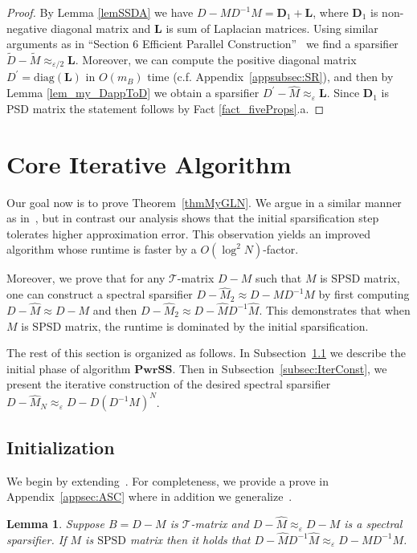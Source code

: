\documentclass[11pt]{article}
\newcommand{\SPSD}{\mathrm{SPSD}}
\newcommand{\GL}{\mathcal{T}}
\newcommand{\PwrSS}{\mathrm{\mathbf{PwrSS}}}
\newcommand{\wD}{\widetilde{D}}
\newcommand{\wM}{\widetilde{M}}
\newcommand{\hM}{\widehat{M}}
\newcommand{\Di}{D^{-1}}
\newcommand{\mD}{\mathbf{D}}
\newcommand{\mL}{\mathbf{L}}
\newcommand{\diag}{\mathrm{diag}}
\newcommand{\prm}{\prime}
\newcommand{\eps}{\epsilon}
\renewcommand{\eps}{\varepsilon}
\newcommand{\mylemma}[2]{\begin{lem}\label{lem:#1}#2\end{lem}}
\newtheorem{lem}[thm]{Lemma}
\numberwithin{thm}{section}
\begin{document}
\begin{proof}
By Lemma \ref{lemSSDA} we have $D-M\Di M=\mD_{1}+\mL$, where $\mD_{1}$ is non-negative diagonal matrix and $\mL$ is sum of Laplacian matrices. Using similar arguments as in ``Section 6 Efficient Parallel Construction''~\cite{PS14} we find a sparsifier $\wD-\wM\approx_{\eps/2}\mL$. Moreover, we can compute the positive diagonal matrix $D^\prm=\diag(\mathbf{L})$ in $O(m_B)$ time (c.f. Appendix~\ref{appsubsec:SR}), and then by Lemma \ref{lem_my_DappToD} we obtain a sparsifier $D^{\prm}-\hM\approx_{\eps}\mL$. Since $\mD_{1}$ is PSD matrix the statement follows by Fact \ref{fact_fiveProps}.a.
\end{proof}



\section{Core Iterative Algorithm}\label{sec:CIA}

Our goal now is to prove Theorem~\ref{thmMyGLN}. We argue in a similar manner as in~\cite{arxivCCLPT15}, but in contrast our analysis shows that the initial sparsification step tolerates higher approximation error. This observation yields an improved algorithm whose runtime is faster by a $O(\log^{2}N)$-factor.

Moreover, we prove that for any $\GL$-matrix $D-M$ such that $M$ is $\SPSD$ matrix, one can construct a spectral sparsifier $D-\hM_2\approx D-M\Di M$ by first computing $D-\hM\approx D-M$ and then $D-\hM_2\approx D-\hM\Di\hM$. This demonstrates that when $M$ is $\SPSD$ matrix, the runtime is dominated by the initial sparsification.

The rest of this section is organized as follows. In Subsection~\ref{subsec:Init_PrwSS} we describe the initial phase of algorithm $\PwrSS$. Then in Subsection~\ref{subsec:IterConst}, we present the iterative construction of the desired spectral sparsifier $D-\hM_{N}\approx_{\eps}D-D(\Di M)^{N}$.


\subsection{Initialization}\label{subsec:Init_PrwSS}

We begin by extending~\cite[Lemma 4.3 and 4.4]{arxivCCLPT15}. For completeness, we provide a prove in Appendix~\ref{appsec:ASC} where in addition we generalize~\cite[Fact 4.2]{arxivCCLPT15}.


\newcommand{\lemSchurRec}
{
Suppose $B=D-M$ is $\GL$-matrix
and $D-\hM \approx_{\eps}D-M$ is a spectral sparsifier.
If $M$ is $\SPSD$ matrix then it holds that $D-\hM \Di \hM \approx_{\eps}D-M\Di M$.
}
\mylemma{lemSchurRec}{\lemSchurRec}
\end{document}
